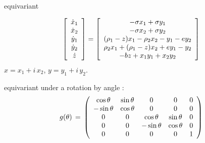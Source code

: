 \begin{frame}{ equivariant}
			\begin{exampleblock}{{\cLe}}
\scriptsize		
\[
		\left[
					\begin{array}{c}
				\dot{x}_1 \\ \dot{x}_2 \\ \dot{y}_1 \\ \dot{y}_2 \\ \dot{z}
				\end{array}
		\right]
=
		\left[
					\begin{array}{c}
				 -\sigma x_1 + \sigma y_1 \\
				-\sigma x_2 + \sigma y_2 \\
                (\RerCLor-z) x_1 - \ImrCLor x_2 -y_1-e y_2 \\
                \ImrCLor x_1 + (\RerCLor-z) x_2 + e y_1- y_2 \\
				-b z + x_1 y_1 + x_2 y_2
				\end{array}
		\right]
\]
$x=x_1+i\,x_2$, $y=y_1+i\,y_2$.
			\end{exampleblock}

\begin{block}{}
equivariant under a  rotation by angle
\gSpace:
\scriptsize		
\[
\LieEl(\gSpace) \,=\,  \left(\barr{ccccc}
  \cos \gSpace  & \sin \gSpace  & 0 & 0 & 0 \\
 -\sin \gSpace  & \cos \gSpace  & 0 & 0 & 0 \\
 0 & 0 &  \cos \gSpace & \sin \gSpace   & 0 \\
 0 & 0 & -\sin \gSpace & \cos \gSpace   & 0 \\
 0 & 0 & 0             & 0              & 1
    \earr\right)
\] %
\end{block}
\end{frame}



